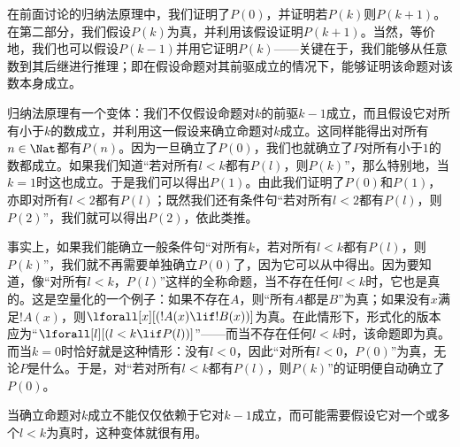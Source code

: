 \documentclass[../../../include/open-logic-section]{subfiles}
\begin{document}


在前面讨论的归纳法原理中，我们证明了$P(0)$，并证明若$P(k)$则$P(k+1)$。在第二部分，我们假设$P(k)$为真，并利用该假设证明$P(k+1)$。当然，等价地，我们也可以假设$P(k-1)$并用它证明$P(k)$——关键在于，我们能够从任意数到其后继进行推理；即在假设命题对其前驱成立的情况下，能够证明该命题对该数本身成立。

归纳法原理有一个变体：我们不仅假设命题对$k$的前驱$k-1$成立，而且假设它对所有小于$k$的数成立，并利用这一假设来确立命题对$k$成立。这同样能得出对所有$n \in \Nat$都有$P(n)$。因为一旦确立了$P(0)$，我们也就确立了$P$对所有小于$1$的数都成立。如果我们知道“若对所有$l<k$都有$P(l)$，则$P(k)$”，那么特别地，当$k=1$时这也成立。于是我们可以得出$P(1)$。由此我们证明了$P(0)$和$P(1)$，亦即对所有$l<2$都有$P(l)$；既然我们还有条件句“若对所有$l<2$都有$P(l)$，则$P(2)$”，我们就可以得出$P(2)$，依此类推。

事实上，如果我们能确立一般条件句“对所有$k$，若对所有$l<k$都有$P(l)$，则$P(k)$”，我们就不再需要单独确立$P(0)$了，因为它可以从中得出。因为要知道，像“对所有$l<k$，$P(l)$”这样的全称命题，当不存在任何$l<k$时，它也是真的。这是空量化的一个例子：如果不存在$A$，则“所有$A$都是$B$”为真；如果没有$x$满足$!A(x)$，则$\lforall[x][(!A(x) \lif !B(x))]$为真。在此情形下，形式化的版本应为“$\lforall[l][(l < k \lif P(l))]$”——而当不存在任何$l < k$时，该命题即为真。而当$k=0$时恰好就是这种情形：没有$l<0$，因此“对所有$l<0$，$P(0)$”为真，无论$P$是什么。于是，对“若对所有$l<k$都有$P(l)$，则$P(k)$”的证明便自动确立了$P(0)$。

当确立命题对$k$成立不能仅仅依赖于它对$k-1$成立，而可能需要假设它对一个或多个$l<k$为真时，这种变体就很有用。
\end{document}
